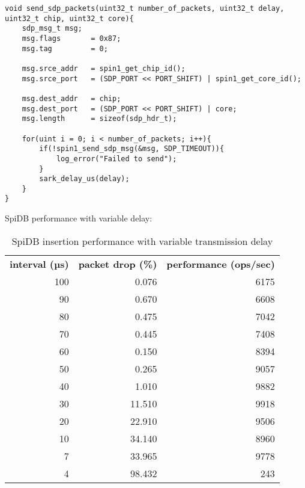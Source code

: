 \begin{lstlisting}[caption={Destination}]
void send_sdp_packets(uint32_t number_of_packets, uint32_t delay, uint32_t chip, uint32_t core){
	sdp_msg_t msg;
    msg.flags       = 0x87;
    msg.tag         = 0;

    msg.srce_addr   = spin1_get_chip_id();
    msg.srce_port   = (SDP_PORT << PORT_SHIFT) | spin1_get_core_id();

    msg.dest_addr   = chip;
    msg.dest_port   = (SDP_PORT << PORT_SHIFT) | core;
    msg.length 		= sizeof(sdp_hdr_t);

    for(uint i = 0; i < number_of_packets; i++){
    	if(!spin1_send_sdp_msg(&msg, SDP_TIMEOUT)){
        	log_error("Failed to send");
        }
        sark_delay_us(delay);
    }
}
\end{lstlisting}

SpiDB performance with variable delay:

\begin{table}
\begin{tabular}{ r | r | r }
\textbf{interval (µs)} & \textbf{packet drop (\%)} & \textbf{performance (ops/sec)}  \\
100 & 0.076 	& 6175 \\
90	& 0.670		& 6608 \\
80	& 0.475		& 7042 \\
70	& 0.445		& 7408 \\
60	& 0.150		& 8394 \\
50	& 0.265		& 9057 \\
40	& 1.010		& 9882 \\
30	& 11.510	& 9918 \\
20	& 22.910	& 9506 \\ 
10	& 34.140	& 8960 \\
7	& 33.965 	& 9778 \\
4	& 98.432 	& 243 \\
\end{tabular}
\caption{SpiDB insertion performance with variable transmission delay}
\label{table:performance_delay}
\end{table}


